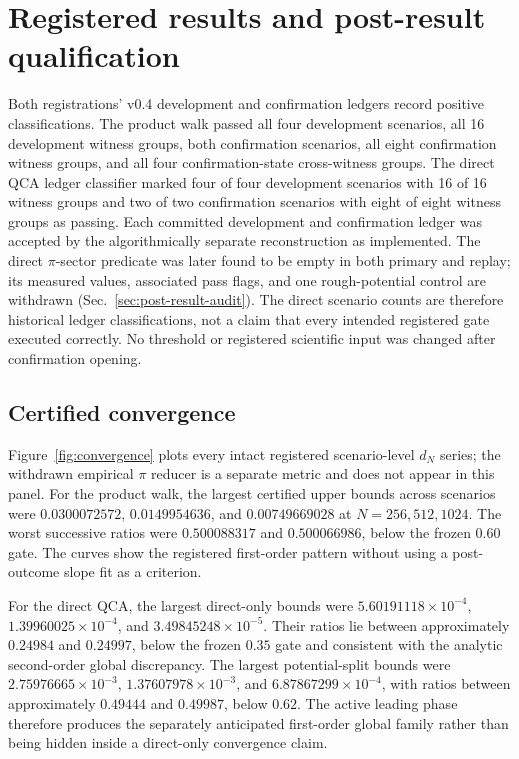\section{Registered results and post-result qualification}
\label{sec:results}

Both registrations' v0.4 development and confirmation ledgers record positive
classifications.  The
product walk passed all four development scenarios, all 16 development
witness groups, both confirmation scenarios, all eight confirmation witness
groups, and all four confirmation-state cross-witness groups.  The direct QCA
ledger classifier marked four of four development scenarios with 16 of 16
witness groups and two of two confirmation scenarios with eight of eight
witness groups as passing.  Each
committed development and confirmation ledger was accepted by the
algorithmically separate reconstruction as implemented.  The direct
$\pi$-sector predicate was later found to be empty in both primary and replay;
its measured values, associated pass flags, and one rough-potential control are withdrawn
(Sec.~\ref{sec:post-result-audit}).  The direct scenario counts are therefore
historical ledger classifications, not a claim that every intended registered
gate executed correctly.  No threshold or registered scientific input was
changed after confirmation opening.

\subsection{Certified convergence}

Figure~\ref{fig:convergence} plots every intact registered scenario-level
$d_N$ series; the withdrawn empirical $\pi$ reducer is a separate metric and
does not appear in this panel.  For the product walk, the largest certified
upper bounds across scenarios were $0.0300072572$, $0.0149954636$, and
$0.00749669028$ at $N=256,512,1024$.  The worst successive ratios were
$0.500088317$ and $0.500066986$, below the frozen $0.60$ gate.  The curves show
the registered first-order pattern without using a post-outcome slope fit as a
criterion.

For the direct QCA, the largest direct-only bounds were
$5.60191118\times10^{-4}$, $1.39960025\times10^{-4}$, and
$3.49845248\times10^{-5}$.  Their ratios lie between approximately $0.24984$
and $0.24997$, below the frozen $0.35$ gate and consistent with the analytic
second-order global discrepancy.  The largest potential-split bounds were
$2.75976665\times10^{-3}$, $1.37607978\times10^{-3}$, and
$6.87867299\times10^{-4}$, with ratios between approximately $0.49444$ and
$0.49987$, below $0.62$.  The active leading phase therefore produces the
separately anticipated first-order global family rather than being hidden
inside a direct-only convergence claim.

